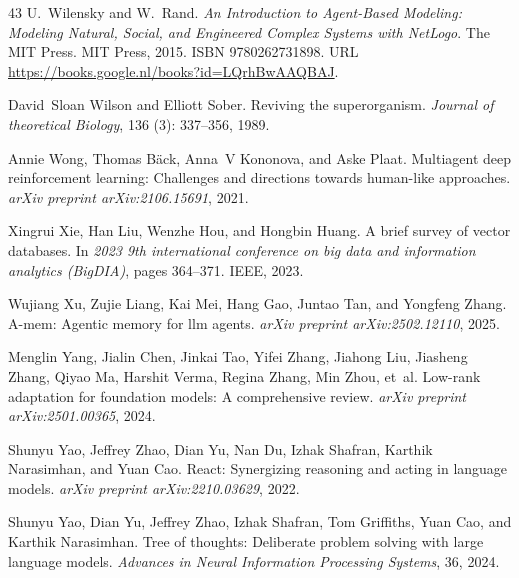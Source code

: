 \begin{thebibliography}{43}
U.~Wilensky and W.~Rand.
\newblock \emph{An Introduction to Agent-Based Modeling: Modeling Natural, Social, and Engineered Complex Systems with NetLogo}.
\newblock The MIT Press. MIT Press, 2015.
\newblock ISBN 9780262731898.
\newblock URL \url{https://books.google.nl/books?id=LQrhBwAAQBAJ}.

David~Sloan Wilson and Elliott Sober.
\newblock Reviving the superorganism.
\newblock \emph{Journal of theoretical Biology}, 136 (3): 337--356, 1989.

Annie Wong, Thomas B{\"a}ck, Anna~V Kononova, and Aske Plaat.
\newblock Multiagent deep reinforcement learning: Challenges and directions towards human-like approaches.
\newblock \emph{arXiv preprint arXiv:2106.15691}, 2021.

Xingrui Xie, Han Liu, Wenzhe Hou, and Hongbin Huang.
\newblock A brief survey of vector databases.
\newblock In \emph{2023 9th international conference on big data and information analytics (BigDIA)}, pages 364--371. IEEE, 2023.

Wujiang Xu, Zujie Liang, Kai Mei, Hang Gao, Juntao Tan, and Yongfeng Zhang.
\newblock A-mem: Agentic memory for llm agents.
\newblock \emph{arXiv preprint arXiv:2502.12110}, 2025.

Menglin Yang, Jialin Chen, Jinkai Tao, Yifei Zhang, Jiahong Liu, Jiasheng Zhang, Qiyao Ma, Harshit Verma, Regina Zhang, Min Zhou, et~al.
\newblock Low-rank adaptation for foundation models: A comprehensive review.
\newblock \emph{arXiv preprint arXiv:2501.00365}, 2024.

Shunyu Yao, Jeffrey Zhao, Dian Yu, Nan Du, Izhak Shafran, Karthik Narasimhan, and Yuan Cao.
\newblock React: Synergizing reasoning and acting in language models.
\newblock \emph{arXiv preprint arXiv:2210.03629}, 2022.

Shunyu Yao, Dian Yu, Jeffrey Zhao, Izhak Shafran, Tom Griffiths, Yuan Cao, and Karthik Narasimhan.
\newblock Tree of thoughts: Deliberate problem solving with large language models.
\newblock \emph{Advances in Neural Information Processing Systems}, 36, 2024.


\end{thebibliography}
